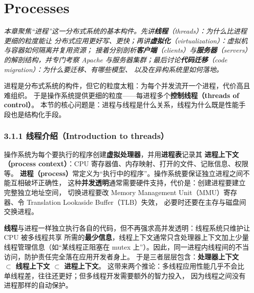 \chapter{Processes}
\begin{center}
\begin{minipage}{0.9\textwidth}
\itshape\small\color{dsgray}
本章聚焦“进程”这一分布式系统的基本构件。先讲\textbf{线程}（threads）：为什么比进程更细的粒度能让
分布式应用更好写、更快；再讲\textbf{虚拟化}（virtualization）：虚拟机与容器如何隔离并复用资源；
接着分别剖析\textbf{客户端}（clients）与\textbf{服务器}（servers）的解剖结构，并专门考察
Apache 与服务器集群；最后讨论\textbf{代码迁移}（code migration）：为什么要迁移、有哪些模型、
以及在异构系统里如何落地。
\end{minipage}
\end{center}


进程是分布式系统的构件，但它的粒度太粗：为每个并发流开一个进程，代价高且难组织。
于是操作系统提供更细的粒度——每进程多个\textbf{控制线程（threads of control）}。
本节的核心问题是：进程与线程是什么关系，线程为什么既是性能手段也是结构化手段。

\subsection*{3.1.1 线程介绍（Introduction to threads）}
操作系统为每个要执行的程序创建\textbf{虚拟处理器}，并用\textbf{进程表}记录其
\textbf{进程上下文（process context）}：CPU 寄存器值、内存映射、打开的文件、记账信息、权限等。
\textbf{进程（process）}常定义为“执行中的程序”。操作系统要保证独立进程之间不能互相破坏正确性，
这种\textbf{并发透明}通常需要硬件支持，代价是：创建进程要建立完整独立地址空间，
切换进程要改 Memory Management Unit（MMU）寄存器、令 Translation Lookaside Buffer（TLB）失效，
必要时还要在主存与磁盘间交换进程。

\textbf{线程}与进程一样独立执行各自的代码，但不再强求高并发透明：线程系统只维护让 CPU 被多线程共享
所需的\textbf{最少信息}，线程上下文通常只含处理器上下文加上少量线程管理信息（如“某线程正阻塞在
mutex 上”）。因此，同一进程内线程间的不当访问，防护责任完全落在应用开发者身上。
于是三者层层包含：\textbf{处理器上下文 $\subset$ 线程上下文 $\subset$ 进程上下文}。
这带来两个推论：多线程应用性能几乎不会比单线程差，往往还更好；但多线程开发需要额外的智力投入，
因为线程之间没有进程那样的自动保护。

